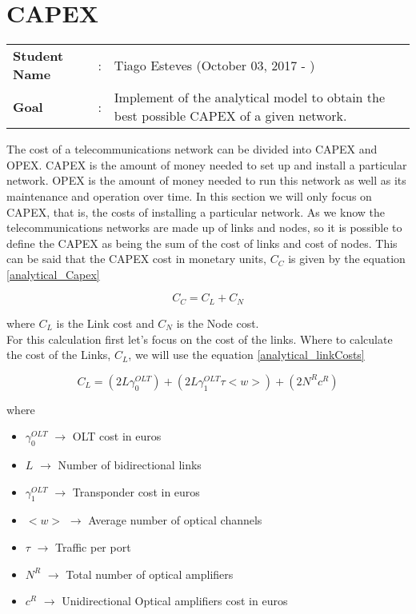 \clearpage

\section{CAPEX}\label{analytical_CAPEX}
\begin{tcolorbox}	
\begin{tabular}{p{2.75cm} p{0.2cm} p{10.5cm}} 	
\textbf{Student Name}  &:& Tiago Esteves    (October 03, 2017 - )\\
\textbf{Goal}          &:& Implement of the analytical model to obtain the best possible CAPEX of a given network.
\end{tabular}
\end{tcolorbox}
\vspace{11pt}

The cost of a telecommunications network can be divided into CAPEX and OPEX.
CAPEX is the amount of money needed to set up and install a particular network.
OPEX is the amount of money needed to run this network as well as its maintenance and operation over time.
In this section we will only focus on CAPEX, that is, the costs of installing a particular network.
As we know the telecommunications networks are made up of links and nodes, so it is possible to define the CAPEX as being the sum of the cost of links and cost of nodes.
This can be said that the CAPEX cost in monetary units, $C_C$ is given by the equation \ref{analytical_Capex}

\begin{equation}
C_C = C_L + C_N
\label{analytical_Capex}
\end{equation}

\vspace{11pt}
\noindent
where $C_L$ is the Link cost and $C_N$ is the Node cost.\\

For this calculation first let's focus on the cost of the links. Where to calculate the cost of the Links, $C_L$, we will use the equation \ref{analytical_linkCosts}

\begin{equation}
C_L = \left(2 L \gamma_0^{OLT}\right) + \left(2 L \gamma_1^{OLT} \tau <w>\right) + \left(2 N^R c^R\right)
\label{analytical_linkCosts}
\end{equation}

\vspace{11pt}
\noindent
where
\begin{itemize}
\item{$\gamma_0^{OLT}$	$\rightarrow$	OLT cost in euros}
\item{$L$				$\rightarrow$	Number of bidirectional links}
\item{$\gamma_1^{OLT}$	$\rightarrow$	Transponder cost in euros}
\item{$<w>$             $\rightarrow$   Average number of optical channels}
\item{$\tau$		    $\rightarrow$	Traffic per port}
\item{$N^R$				$\rightarrow$	Total number of optical amplifiers}
\item{$c^R$				$\rightarrow$	Unidirectional Optical amplifiers cost in euros}
\end{itemize}

